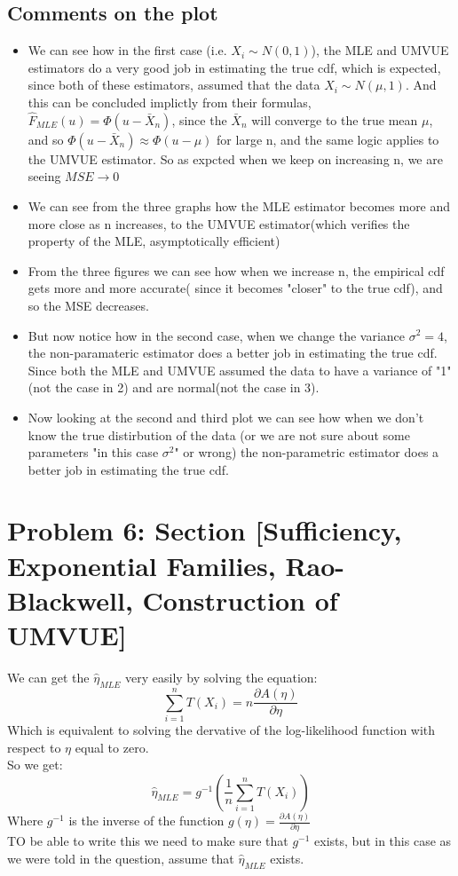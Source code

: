 \documentclass[12pt]{article}
\begin{document}
\subsection*{Comments on the plot}
\begin{itemize}
  \item We can see how in the first case (i.e. $X_i \sim N(0,1)$), the MLE and UMVUE estimators do a very good job in estimating the true cdf, which is expected, since both of these estimators, assumed that the data $X_i \sim N(\mu, 1)$. And this can be concluded implictly from their formulas, $\hat{F}_{MLE}(u) = \Phi(u-\bar{X}_n)$, since the $\bar{X}_n$ will converge to the true mean $\mu$, and so $\Phi(u-\bar{X}_n) \approx \Phi(u-\mu)$ for large n, and the same logic applies to the UMVUE estimator. So as expcted when we keep on increasing n, we are seeing $MSE \to 0$
  \item We can see from the three graphs how the MLE estimator becomes more and more close as n increases, to the UMVUE estimator(which verifies the property of the MLE, asymptotically efficient)
  \item From the three figures we can see how when we increase n, the empirical cdf gets more and more accurate( since it becomes "closer" to the true cdf), and so the MSE decreases. 
   
  \item But now notice how in the second case, when we change the variance $\sigma^2 = 4$, the non-paramateric estimator does a better job in estimating the true cdf. Since both the MLE and UMVUE assumed the data to have a variance of "1"(not the case in 2) and are normal(not the case in 3).  
  \item Now looking at the second and third plot we can see how when we don't know the true distirbution of the data (or we are not sure about some parameters "in this case $\sigma^2$" or wrong) the non-parametric estimator does a better job in estimating the true cdf. 
\end{itemize}
\section*{Problem 6: Section [Sufficiency, Exponential Families, Rao-Blackwell, Construction of UMVUE]}
We can get the $\hat{\eta}_{MLE}$ very easily by solving the equation: 
\[
\sum_{i=1}^{n}T(X_i) = n\frac{\partial A(\eta)}{\partial \eta}
\] 
Which is equivalent to solving the dervative of the log-likelihood function with respect to $\eta$ equal to zero. \\
So we get: 
\[
\hat{\eta}_{MLE} = g^{-1}(\frac{1}{n}\sum_{i=1}^{n}T(X_i))
\]
Where $g^{-1}$ is the inverse of the function $g(\eta) = \frac{\partial A(\eta)}{\partial \eta}$\\
TO be able to write this we need to make sure that $g^{-1}$ exists, but in this case as we were told in the question, assume that $\hat{\eta}_{MLE}$ exists. \\
\end{document}

